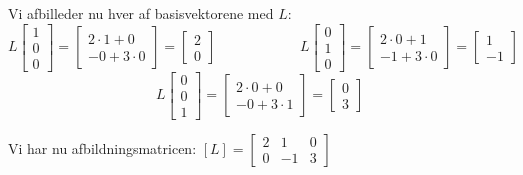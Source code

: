 {    Vi afbilleder nu hver af basisvektorene med \(L\):
    \[
        L \begin{bmatrix}
            1 \\
            0 \\
            0
        \end{bmatrix} =
        \begin{bmatrix}
            2 \cdot 1 + 0 \\
            -0 + 3 \cdot 0
        \end{bmatrix} =
        \begin{bmatrix}
            2 \\
            0
        \end{bmatrix}
    \hspace{6em}
        L \begin{bmatrix}
            0 \\
            1 \\
            0
        \end{bmatrix} =
        \begin{bmatrix}
            2 \cdot 0 + 1 \\
            -1 + 3 \cdot 0
        \end{bmatrix} =
        \begin{bmatrix}
            1 \\
            -1
        \end{bmatrix}
    \]
    \[
        L \begin{bmatrix}
            0 \\
            0 \\
            1
        \end{bmatrix} =
        \begin{bmatrix}
            2 \cdot 0 + 0 \\
            -0 + 3 \cdot 1
        \end{bmatrix} =
        \begin{bmatrix}
            0 \\
            3
        \end{bmatrix}
    \]

    Vi har nu afbildningsmatricen:
    \(
        [L] =
        \begin{bmatrix}
            2 & 1 & 0 \\
            0 & -1 & 3
        \end{bmatrix}
    \)

}
